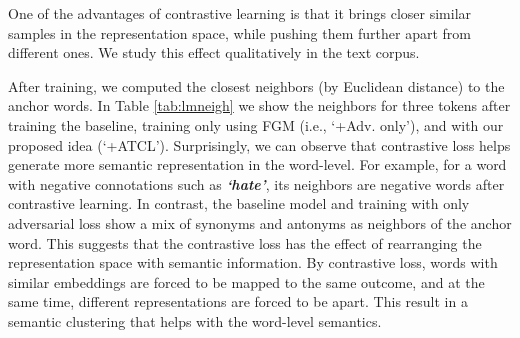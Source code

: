 \documentclass[letterpaper]{article} %
\begin{document}
One of the advantages of contrastive learning is that it brings closer similar samples in the representation space, while pushing them further apart from different ones. We study this effect qualitatively in the text corpus.

After training, we computed the closest neighbors (by Euclidean distance) to the anchor words. In Table \ref{tab:lmneigh} we show the neighbors for three tokens after training the baseline, training only using FGM (i.e., `+Adv. only'), and with our proposed idea (`+ATCL'). Surprisingly, we can observe that contrastive loss helps generate more semantic representation in the word-level. 
For example, for a word with negative connotations such as \textit{\textbf{`hate'}}, its neighbors are negative words after contrastive learning. In contrast, the baseline model and training with only adversarial loss show a mix of synonyms and antonyms as neighbors of the anchor word. This suggests that the contrastive loss has the effect of rearranging the representation space with semantic information. By contrastive loss, words with similar embeddings are forced to be mapped to the same outcome, and at the same time, different representations are forced to be apart. This result in a semantic clustering %
that helps with the word-level semantics.
\end{document}
